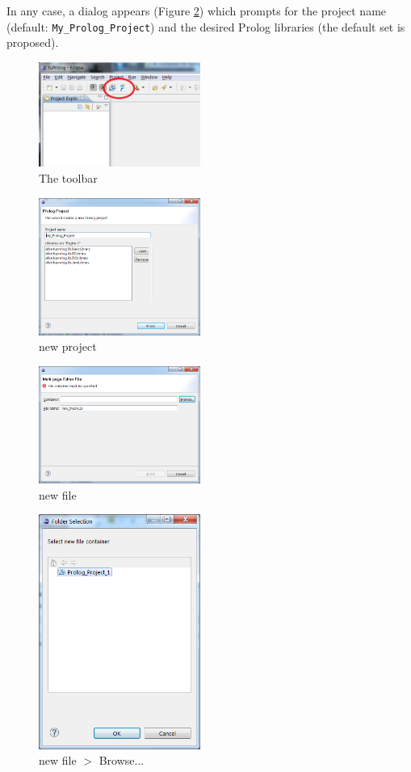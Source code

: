 In any case, a dialog appears (Figure \ref{fig:plugin2}) which prompts for the project name (default: \texttt{My\_Prolog\_Project}) and the desired Prolog libraries (the default set is proposed).

\begin{figure}
  \includegraphics[width=200px]{images/plugin1.png}
  \caption{The \tuprolog{} toolbar}\label{fig:plugin1}
\end{figure}

\begin{figure}
  \includegraphics[width=200px]{images/plugin2.png}
  \caption{new \tuprolog{} project}\label{fig:plugin2}
\end{figure}

\begin{figure}
  \includegraphics[width=200px]{images/plugin3.png}
  \caption{new \tuprolog{} file}\label{fig:plugin3}
\end{figure}

\begin{figure}
  \includegraphics[width=200px]{images/plugin4.png}
  \caption{new \tuprolog{} file $>$ Browse...}\label{fig:plugin4}
\end{figure}

